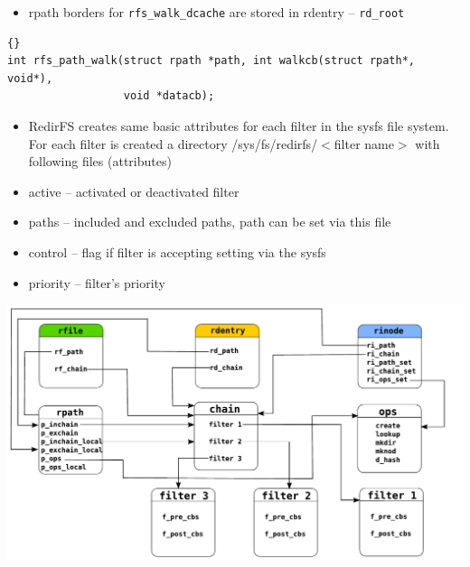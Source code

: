 \documentclass[30pt,a4paper,landscape,headrule,footrule]{foils}
\begin{document}

\begin{itemize}
\item  rpath borders for \texttt{rfs\_walk\_dcache} are stored in rdentry --
\texttt{rd\_root}
\end{itemize}

\begin{lstlisting}[frame=trbl]{}
int rfs_path_walk(struct rpath *path, int walkcb(struct rpath*, void*),
                  void *datacb);
\end{lstlisting}

\begin{itemize}
\item RedirFS creates same basic attributes for each filter in the sysfs
file system. For each filter is created a directory /sys/fs/redirfs/$<$filter
name$>$ with following files (attributes)
\item active -- activated or deactivated filter 
\item paths -- included and excluded paths, path can be set via this file
\item control -- flag if filter is accepting setting via the sysfs
\item priority -- filter's priority
\end{itemize}

\includegraphics{rfs_objs_conn.pdf}
\end{document}
